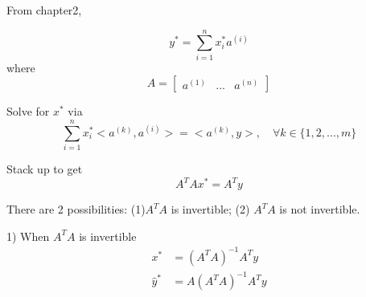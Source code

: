 From chapter2, 

\begin{equation*}
y^* = \sum^n_{i=1}x_i^*a^{(i)}
\end{equation*}
where 
$$ A =   
\left[
\begin{matrix}
a^{(1)} & ... & a^{(n)}
\end{matrix}
\right]
$$

Solve for $x^*$ via
\begin{equation*}
\sum^n_{i=1}x_i^*<a^{(k)}, a^{(i)}> = <a^{(k)}, y>, \quad \forall k \in \{1,2,...,m \}
\end{equation*}

Stack up to get 
\begin{equation*}
A^TAx^* = A^Ty
\end{equation*}

There are 2 possibilities: (1)$A^TA$ is invertible; (2) $A^TA$ is not invertible.

1) When $A^TA$ is invertible
\begin{align*}
x^* &= (A^TA)^{-1}A^Ty\\
\hat{y}^* &= A(A^TA)^{-1}A^Ty
\end{align*}

